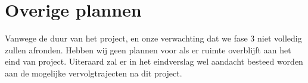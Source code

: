 \section{Overige plannen}
\label{overige}
Vanwege de duur van het project, en onze verwachting dat we fase 3 niet volledig zullen afronden. Hebben wij geen plannen voor als er ruimte overblijft aan het eind van project. Uiteraard zal er in het eindverslag wel aandacht besteed worden aan de mogelijke vervolgtrajecten na dit project.

